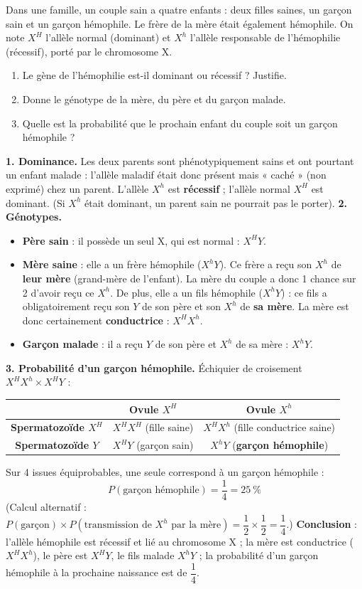 \documentclass[11pt]{article}
\begin{document}
\begin{exoresolu}
Dans une famille, un couple sain a quatre enfants : deux filles saines, un garçon sain et un garçon hémophile. Le frère de la mère était également hémophile. On note $X^H$ l'allèle normal (dominant) et $X^h$ l'allèle responsable de l'hémophilie (récessif), porté par le chromosome X.
\begin{enumerate}
\item Le gène de l'hémophilie est-il dominant ou récessif ? Justifie.
\item Donne le génotype de la mère, du père et du garçon malade.
\item Quelle est la probabilité que le prochain enfant du couple soit un garçon hémophile ?
\end{enumerate}
\tcblower
\textbf{1. Dominance.} Les deux parents sont phénotypiquement sains et ont pourtant un enfant malade : l'allèle maladif était donc présent mais « caché » (non exprimé) chez un parent. L'allèle $X^h$ est \textbf{récessif} ; l'allèle normal $X^H$ est dominant. (Si $X^h$ était dominant, un parent sain ne pourrait pas le porter).
\textbf{2. Génotypes.}
\begin{itemize}
\item \textbf{Père sain} : il possède un seul X, qui est normal : $X^H Y$.
\item \textbf{Mère saine} : elle a un frère hémophile ($X^h Y$). Ce frère a reçu son $X^h$ de \textbf{leur mère} (grand-mère de l'enfant). La mère du couple a donc 1 chance sur 2 d'avoir reçu ce $X^h$. De plus, elle a un fils hémophile ($X^h Y$) : ce fils a obligatoirement reçu son $Y$ de son père et son $X^h$ de \textbf{sa mère}. La mère est donc certainement \textbf{conductrice} : $X^H X^h$.
\item \textbf{Garçon malade} : il a reçu $Y$ de son père et $X^h$ de sa mère : $X^h Y$.
\end{itemize}
\textbf{3. Probabilité d'un garçon hémophile.} Échiquier de croisement $X^H X^h \times X^H Y$ :
\begin{center}
\begin{tabular}{|c|c|c|}
\hline
\rowcolor{popblueL} & \textbf{Ovule $X^H$} & \textbf{Ovule $X^h$} \\
\hline
\textbf{Spermatozoïde $X^H$} & $X^H X^H$ (fille saine) & $X^H X^h$ (fille conductrice saine) \\
\hline
\textbf{Spermatozoïde $Y$} & $X^H Y$ (garçon sain) & $X^h Y$ (\textbf{garçon hémophile}) \\
\hline
\end{tabular}
\end{center}
Sur 4 issues équiprobables, une seule correspond à un garçon hémophile :
\[ P(\text{garçon hémophile}) = \frac{1}{4} = 25\ \% \]
(Calcul alternatif : $P(\text{garçon}) \times P(\text{transmission de } X^h \text{ par la mère}) = \dfrac{1}{2} \times \dfrac{1}{2} = \dfrac{1}{4}$.)
\textbf{Conclusion} : l'allèle hémophile est récessif et lié au chromosome X ; la mère est conductrice ($X^H X^h$), le père est $X^H Y$, le fils malade $X^h Y$ ; la probabilité d'un garçon hémophile à la prochaine naissance est de $\dfrac{1}{4}$.
\end{exoresolu}
\end{document}
